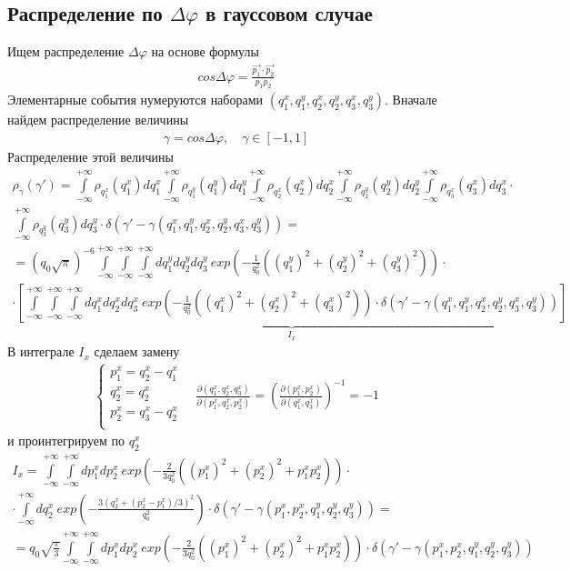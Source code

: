 \documentclass[12pt]{article}
\renewcommand{\l}{\left( }
\renewcommand{\r}{\right) }
\renewcommand{\phi}{\varphi}
\newcommand{\pd}{\partial}
\newcommand{\br}[1]{\l {#1} \r}
\newcommand{\rint}{\int\limits_{-\infty}^{+\infty}}
\newcommand{\jacobian}[2]{\frac{\pd \br{#1}}{\pd \br{#2}}}
\begin{document}
\subsection{Распределение по $\Delta \phi$ в гауссовом случае}
Ищем распределение $\Delta \phi$ на основе формулы
\begin{eqnarray}
cos \Delta \phi = \frac{\vec{p_1} \cdot \vec{p_2}}{p_1 p_2}
\end{eqnarray}
Элементарные события нумеруются наборами $\br{q_1^x, q_1^y, q_2^x, q_2^y, q_3^x, q_3^y}$. Вначале найдем распределение величины
\begin{eqnarray}
\gamma = cos \Delta \phi,\quad \gamma \in \left[ -1, 1 \right]
\end{eqnarray}
Распределение этой величины
\begin{gather}
\rho_\gamma \br{\gamma'} = \rint \rho_{q_1^x} \br{q_1^x} dq_1^x \rint \rho_{q_1^y} \br{q_1^y} dq_1^y \rint \rho_{q_2^x} \br{q_2^x} dq_2^x \rint \rho_{q_2^y} \br{q_2^y} dq_2^y \rint \rho_{q_3^x} \br{q_3^x} dq_3^x \cdot \nonumber \\
\label{BigIntegral}
\rint \rho_{q_3^y} \br{q_3^y} dq_3^y \cdot \delta \br{\gamma' - \gamma \br{q_1^x, q_1^y, q_2^x, q_2^y, q_3^x, q_3^y}} = \\
= \br{q_0 \sqrt\pi}^{-6} \rint \rint \rint dq_1^y dq_2^y dq_3^y \ exp \br{-\frac{1}{q_0^2} \br{\br{q_1^y}^2 +\br{q_2^y}^2 + \br{q_3^y}^2}} \cdot \nonumber \\
\cdot \underbrace{\left[ \rint \rint \rint dq_1^x dq_2^x dq_3^x \ exp \br{-\frac{1}{q_0^2} \br{\br{q_1^x}^2 +\br{q_2^x}^2 + \br{q_3^x}^2}} \cdot \delta \br{\gamma' - \gamma \br{q_1^x, q_1^y, q_2^x, q_2^y, q_3^x, q_3^y}} \right]}_{I_x}\nonumber
\end{gather}
В интеграле $I_x$ сделаем замену
\begin{eqnarray}
\begin{cases}
p_1^x = q_2^x - q_1^x \\
q_2^x = q_2^x \\
p_2^x = q_3^x - q_2^x \\
\end{cases} \quad
\jacobian{q_1^x, q_2^x, q_3^x}{p_1^x, q_2^x, p_2^x} = \br{\jacobian{p_1^x, p_2^x}{q_1^x, q_3^x}}^{-1} = -1
\end{eqnarray}
и проинтегрируем по $q_2^x$
\begin{gather}
I_x = \rint \rint dp_1^x dp_2^x \ exp \br{-\frac{2}{3q_0^2} \br{\br{p_1^x}^2 + \br{p_2^x}^2 + p_1^x p_2^x}} \cdot \nonumber \\
\cdot \rint dq_2^x \ exp \br{-\frac{3\br{q_2^x + \br{p_2^x - p_1^x}/3}^2}{q_0^2}} \cdot \delta \br{\gamma' - \gamma \br{p_1^x, p_2^x, q_1^y, q_2^y, q_3^y}} = \\
= q_0\sqrt{\frac{\pi}{3}} \rint \rint dp_1^x dp_2^x \ exp \br{-\frac{2}{3q_0^2} \br{\br{p_1^x}^2 + \br{p_2^x}^2 + p_1^x p_2^x}} \cdot \delta \br{\gamma' - \gamma \br{p_1^x, p_2^x, q_1^y, q_2^y, q_3^y}} \nonumber
\end{gather}
\end{document}
